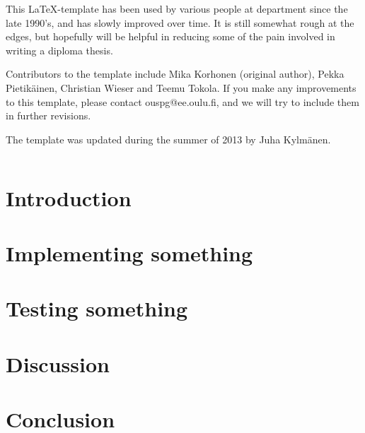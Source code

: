 \documentclass[a4paper,12pt,titlepage]{dithesis}
\begin{document}

\sisluettelo

This \LaTeX -template has been used by various people at department
since the late 1990's, and has slowly improved over time.  It is still
somewhat rough at the edges, but hopefully will be helpful in reducing
some of the pain involved in writing a diploma thesis.

Contributors to the template include Mika Korhonen (original author),
Pekka Pietikäinen, Christian Wieser and Teemu Tokola.  If you make any
improvements to this template, please contact ouspg@ee.oulu.fi, and we
will try to include them in further revisions.

The template was updated during the summer of 2013 by Juha Kylmänen.


\setlongtables
\begin{longtable}[l]{p{3cm}p{}}
  
\end{longtable}
\setcounter{table}{0}

\chapter{Introduction}
\sivunumerot

\chapter{Implementing something}

\chapter{Testing something}

\chapter{Discussion}

\chapter{Conclusion}



\end{document}
